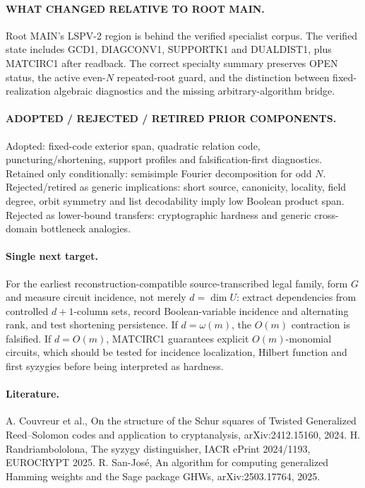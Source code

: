 \documentclass[11pt]{article}
\begin{document}
\paragraph{WHAT CHANGED RELATIVE TO ROOT MAIN.}
Root MAIN's LSPV-2 region is behind the verified specialist corpus. The verified state includes GCD1, DIAGCONV1, SUPPORTK1 and DUALDIST1, plus MATCIRC1 after readback. The correct specialty summary preserves OPEN status, the active even-\(N\) repeated-root guard, and the distinction between fixed-realization algebraic diagnostics and the missing arbitrary-algorithm bridge.

\paragraph{ADOPTED / REJECTED / RETIRED PRIOR COMPONENTS.}
Adopted: fixed-code exterior span, quadratic relation code, puncturing/shortening, support profiles and falsification-first diagnostics. Retained only conditionally: semisimple Fourier decomposition for odd \(N\). Rejected/retired as generic implications: short source, canonicity, locality, field degree, orbit symmetry and list decodability imply low Boolean product span. Rejected as lower-bound transfers: cryptographic hardness and generic cross-domain bottleneck analogies.

\paragraph{Single next target.}
For the earliest reconstruction-compatible source-transcribed legal family, form \(G\) and measure circuit incidence, not merely \(d=\dim U\): extract dependencies from controlled \(d+1\)-column sets, record Boolean-variable incidence and alternating rank, and test shortening persistence. If \(d=\omega(m)\), the \(O(m)\) contraction is falsified. If \(d=O(m)\), MATCIRC1 guarantees explicit \(O(m)\)-monomial circuits, which should be tested for incidence localization, Hilbert function and first syzygies before being interpreted as hardness.

\paragraph{Literature.}
A. Couvreur et al., On the structure of the Schur squares of Twisted Generalized Reed--Solomon codes and application to cryptanalysis, arXiv:2412.15160, 2024. H. Randriambololona, The syzygy distinguisher, IACR ePrint 2024/1193, EUROCRYPT 2025. R. San-Jos\'e, An algorithm for computing generalized Hamming weights and the Sage package GHWs, arXiv:2503.17764, 2025.
\end{document}
